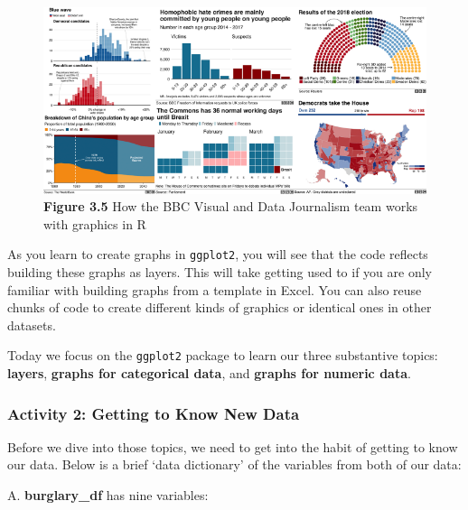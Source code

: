 \documentclass[
]{book}
\begin{document}
\begin{figure}
\centering
\includegraphics{Images/bbc_r.png}
\caption{\textbf{Figure 3.5} How the BBC Visual and Data Journalism team works with graphics in R}
\end{figure}

As you learn to create graphs in \texttt{ggplot2}, you will see that the code reflects building these graphs as layers. This will take getting used to if you are only familiar with building graphs from a template in Excel. You can also reuse chunks of code to create different kinds of graphics or identical ones in other datasets.

Today we focus on the \texttt{ggplot2} package to learn our three substantive topics: \textbf{layers}, \textbf{graphs for categorical data}, and \textbf{graphs for numeric data}.

\hypertarget{activity-2-getting-to-know-new-data}{%
\subsubsection{Activity 2: Getting to Know New Data}\label{activity-2-getting-to-know-new-data}}

Before we dive into those topics, we need to get into the habit of getting to know our data. Below is a brief `data dictionary' of the variables from both of our data:

A. \textbf{burglary\_df} has nine variables:
\end{document}
